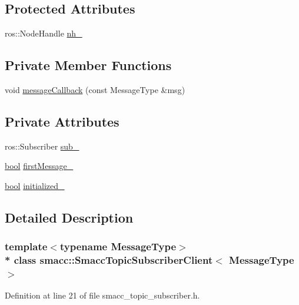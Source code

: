 \subsection*{Protected Attributes}
\begin{DoxyCompactItemize}
\item 
ros\+::\+Node\+Handle \hyperlink{classsmacc_1_1SmaccTopicSubscriberClient_aed36e84de0628e1a8769be5f87664b59}{nh\+\_\+}
\end{DoxyCompactItemize}
\subsection*{Private Member Functions}
\begin{DoxyCompactItemize}
\item 
void \hyperlink{classsmacc_1_1SmaccTopicSubscriberClient_a76f1850606059b39c77d181177bba442}{message\+Callback} (const Message\+Type \&msg)
\end{DoxyCompactItemize}
\subsection*{Private Attributes}
\begin{DoxyCompactItemize}
\item 
ros\+::\+Subscriber \hyperlink{classsmacc_1_1SmaccTopicSubscriberClient_aeb481004e428a5d989f39c77321427b6}{sub\+\_\+}
\item 
\hyperlink{classbool}{bool} \hyperlink{classsmacc_1_1SmaccTopicSubscriberClient_a82a44f35d08659bba1e642650296dc5d}{first\+Message\+\_\+}
\item 
\hyperlink{classbool}{bool} \hyperlink{classsmacc_1_1SmaccTopicSubscriberClient_a12a2a96e0b93757b7eb8631da7cd6893}{initialized\+\_\+}
\end{DoxyCompactItemize}


\subsection{Detailed Description}
\subsubsection*{template$<$typename Message\+Type$>$\\*
class smacc\+::\+Smacc\+Topic\+Subscriber\+Client$<$ Message\+Type $>$}



Definition at line 21 of file smacc\+\_\+topic\+\_\+subscriber.\+h.



